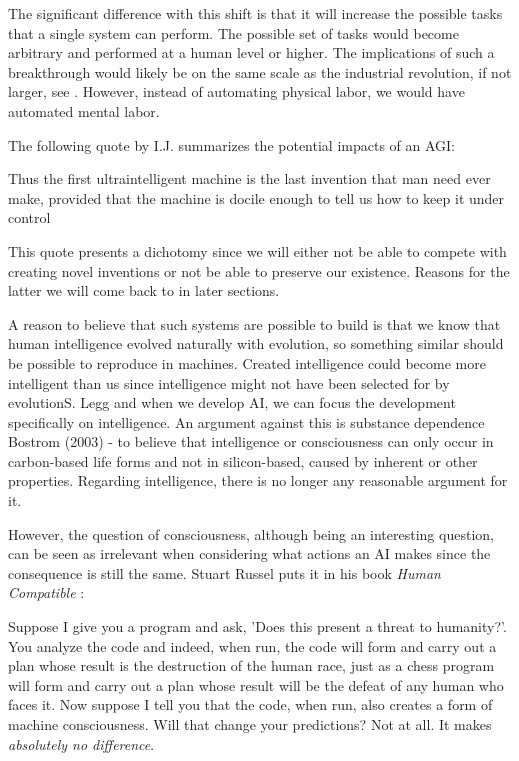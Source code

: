 \documentclass[12pt,A4]{report}
\newcommand{\autobaj}{}
\theoremstyle{definition}
\begin{document}
The significant difference with this shift is that it will increase the possible tasks that a single system can perform. The possible set of tasks would become arbitrary and performed at a human level or higher. The implications of such a breakthrough would likely be on the same scale as the industrial revolution, if not larger, see \citet{CritchKruger}. However, instead of automating physical labor, we would have automated mental labor. 

The following quote by I.J. \citet[p.33]{IJGood} summarizes the potential impacts of an AGI: 
\begin{displayquote}
Thus the first ultraintelligent machine is the last invention that man need ever make, provided that the machine is docile enough to tell us how to keep it under control
\end{displayquote}
This quote presents a dichotomy since we will either not be able to compete with creating novel inventions or not be able to preserve our existence. Reasons for the latter we will come back to in later sections. 

A reason to believe that such systems are possible to build is that we know that human intelligence evolved naturally with evolution, so something similar should be possible to reproduce in machines. Created intelligence could become more intelligent than us since intelligence might not have been selected for by evolution\autobaj{S. Legg} and when we develop AI, we can focus the development specifically on intelligence. An argument against this is substance dependence \autobaj{Bostrom (2003)} - to believe that intelligence or consciousness can only occur in carbon-based life forms and not in silicon-based, caused by inherent or other properties. Regarding intelligence, there is no longer any reasonable argument for it. 

However, the question of consciousness, although being an interesting question, can be seen as irrelevant when considering what actions an AI makes since the consequence is still the same. Stuart Russel puts it in his book \textit{Human Compatible} \citet[p.22]{HumanCompatible}: 
\begin{displayquote}
  Suppose I give you a program and ask, 'Does this present a threat to humanity?'. You analyze the code and indeed, when run, the code will form and carry out a plan whose result is the destruction of the human race, just as a chess program will form and carry out a plan whose result will be the defeat of any human who faces it. Now suppose I tell you that the code, when run, also creates a form of machine consciousness. Will that change your predictions? Not at all. It makes \textit{absolutely no difference}.
\end{displayquote}
\end{document}
